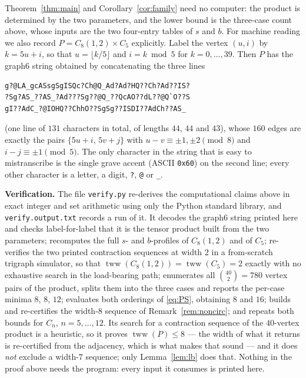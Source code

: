 \documentclass[11pt]{amsart}
\theoremstyle{remark}
\DeclareMathOperator{\tww}{tww}
\begin{document}
Theorem~\ref{thm:main} and Corollary~\ref{cor:family} need no computer: the
product is determined by the two parameters, and the lower bound is the
three-case count above, whose inputs are the two four-entry tables of $s$ and
$b$. For machine reading we also record $P=C_8(1,2)\times C_5$ explicitly.
Label the vertex $(u,i)$ by $k=5u+i$, so that $u=\lfloor k/5\rfloor$ and
$i=k\bmod5$ for $k=0,\dots,39$. Then $P$ has the graph6 string obtained by
concatenating the three lines
\begin{verbatim}
g?@LA_gcASsgSgISQc?Ch@Q_Ad?Ad?HQ??Ch?Ad??IS?
?Sg?AS_??AS_?Ad???Sg??@Q_??QcAO??dL??@Q`O??S
gI??AdC_?@IOHQ??ChhO??SgSg??ISDI??AdCh??AS_
\end{verbatim}
\noindent
(one line of $131$ characters in total, of lengths $44$, $44$ and $43$), whose
$160$ edges are exactly the pairs
$\{5u+i,\,5v+j\}$ with $u-v\equiv\pm1,\pm2\pmod 8$ and $i-j\equiv\pm1\pmod5$.
The only character in the string that is easy to mistranscribe is the single
grave accent (ASCII \texttt{0x60}) on the second line; every other character is
a letter, a digit, \texttt{?}, \texttt{@} or \texttt{\_}.

\medskip
\noindent\textbf{Verification.}
The file \texttt{verify.py} re-derives the computational claims above in exact
integer and set arithmetic using only the Python standard library, and
\texttt{verify.output.txt} records a run of it. It decodes the graph6 string
printed here and checks label-for-label that it is the tensor product built from
the two parameters; recomputes the full $s$- and $b$-profiles of $C_8(1,2)$ and
of $C_5$; re-verifies the two printed contraction sequences at width $2$ in a
from-scratch trigraph simulator, so that $\tww(C_8(1,2))=\tww(C_5)=2$ exactly
with no exhaustive search in the load-bearing path; enumerates all
$\binom{40}{2}=780$ vertex pairs of the product, splits them into the three
cases and reports the per-case minima $8$, $8$, $12$; evaluates both orderings
of \eqref{eq:PS}, obtaining $8$ and $16$; builds and re-certifies the width-$8$
sequence of Remark~\ref{rem:noncirc}; and repeats both bounds for $C_n$,
$n=5,\dots,12$. Its search for a contraction sequence of the $40$-vertex
product is a heuristic, so it proves $\tww(P)\le8$ --- the width of what it
returns is re-certified from the adjacency, which is what makes that sound ---
and it does \emph{not} exclude a width-$7$ sequence; only Lemma~\ref{lem:lb}
does that. Nothing in the proof above needs the program: every input it consumes
is printed here.
\end{document}
